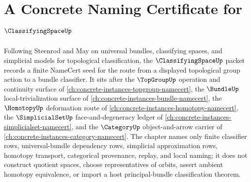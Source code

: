 \chapter{A Concrete Naming Certificate for $\ClassifyingSpaceUp$}
\label{ch:concrete-instances-classifying-space-namecert}

Following Steenrod and May on universal bundles, classifying spaces, and simplicial models for topological classification, the $\ClassifyingSpaceUp$ packet records a finite NameCert seed for the route from a displayed topological group action to a bundle classifier. It sits after the $\TopGroupUp$ operation and continuity surface of \autoref{ch:concrete-instances-topgroup-namecert}, the $\BundleUp$ local-trivialization surface of \autoref{ch:concrete-instances-bundle-namecert}, the $\HomotopyUp$ deformation route of \autoref{ch:concrete-instances-homotopy-namecert}, the $\SimplicialSetUp$ face-and-degeneracy ledger of \autoref{ch:concrete-instances-simplicialset-namecert}, and the $\CategoryUp$ object-and-arrow carrier of \autoref{ch:concrete-instances-category-namecert}. The chapter names only finite classifier rows, universal-bundle dependency rows, simplicial approximation rows, homotopy transport, categorical provenance, replay, and local naming; it does not construct quotient spaces, choose representatives of orbits, assert ambient homotopy equivalence, or import a host principal-bundle classification theorem.

